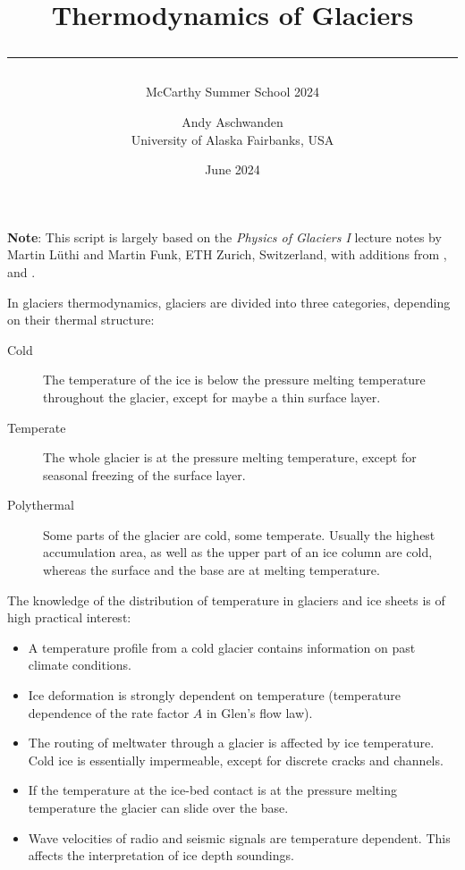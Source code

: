 \documentclass[parskip=half]{scrartcl}
\begin{document}
\title{Thermodynamics of Glaciers\\[.5em]
\rule[1.em]{\textwidth}{2pt}}
\subtitle{McCarthy Summer School 2024}

\date{June 2024}

\author{
  \small Andy Aschwanden\\[-.5em] 
 \small University of Alaska Fairbanks, USA}


\maketitle

\textbf{Note}: This script is largely based on the \emph{Physics of
Glaciers I} lecture notes by Martin L\"uthi and Martin Funk, ETH
Zurich, Switzerland, with additions from \cite{GreveBlatter_disg},
\cite{Gusmeroli2010} and \cite{Aschwanden2012}.

\vspace{1em}

In glaciers thermodynamics, glaciers are divided into three categories, depending on their thermal structure:
%
\begin{description}
\item[Cold] The temperature of the ice is below the pressure melting
temperature throughout the glacier, except for maybe a thin surface
layer.
\item[Temperate] The whole glacier is at the pressure melting
temperature, except for seasonal freezing of the surface layer.
\item[Polythermal] Some parts of the glacier are cold, some temperate.
Usually the highest accumulation area, as well as the upper part of an
ice column are cold, whereas the surface and the base are at melting
temperature.
\end{description}
%
The knowledge of the distribution of temperature in glaciers and ice
sheets is of high practical interest:
%
\begin{itemize}\itemsep0ex
\item A temperature profile from a cold glacier contains information
on past climate conditions.
\item Ice deformation is strongly dependent on temperature
(temperature dependence of the rate factor $A$ in Glen's flow law).
\item The routing of meltwater through a glacier is affected by ice
temperature.  Cold ice is essentially impermeable, except for discrete
cracks and channels.
\item If the temperature at the ice-bed contact is at the pressure
melting temperature the glacier can slide over the base.
\item Wave velocities of radio and seismic signals are temperature
dependent. This affects the interpretation of ice depth soundings.
\end{itemize}
\end{document}
